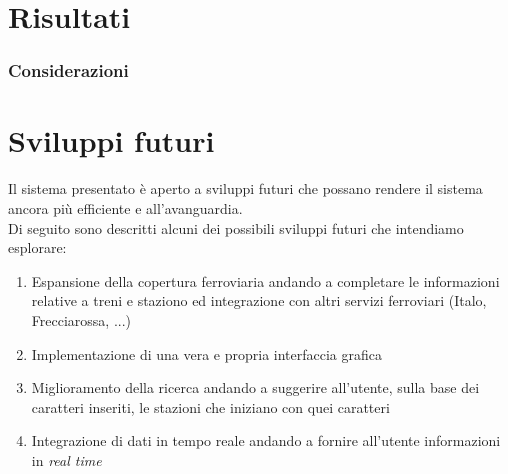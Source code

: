 \documentclass[italian,12pt,a4paper]{article}
\begin{document}
	\section{Risultati}


	
	\subsubsection{Considerazioni}
	
	\section{Sviluppi futuri}
	Il sistema presentato è aperto a sviluppi futuri che possano rendere il sistema ancora più efficiente e all'avanguardia. \\
	Di seguito sono descritti alcuni dei possibili sviluppi futuri che intendiamo esplorare:
	
	\begin{enumerate}
		\item Espansione della copertura ferroviaria andando a completare le informazioni relative a treni e staziono ed integrazione con altri servizi ferroviari (Italo, Frecciarossa, ...)
		\item Implementazione di una vera e propria interfaccia grafica
		\item Miglioramento della ricerca andando a suggerire all'utente, sulla base dei caratteri inseriti, le stazioni che iniziano con quei caratteri
		\item Integrazione di dati in tempo reale andando a fornire all'utente informazioni in \textit{real time}

	\end{enumerate}
	\printbibliography
	
\end{document}
